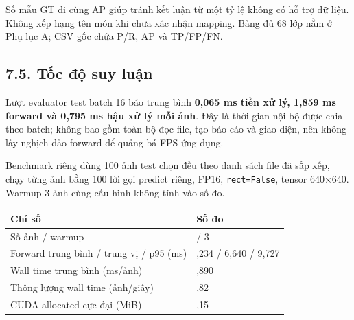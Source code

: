 \documentclass[
  vietnamese,
  12pt,
  a4paper,
]{article}
\newcounter{none} %
\begin{document}
\endgroup

Số mẫu GT đi cùng AP giúp tránh kết luận từ một tỷ lệ không có hỗ trợ dữ
liệu. Không xếp hạng tên món khi chưa xác nhận mapping. Bảng đủ 68 lớp
nằm ở Phụ lục A; CSV gốc chứa P/R, AP và TP/FP/FN.

\subsection{7.5. Tốc độ suy
luận}\label{tux1ed1c-ux111ux1ed9-suy-luux1eadn}

Lượt evaluator test batch 16 báo trung bình \textbf{0,065 ms tiền xử lý,
1,859 ms forward và 0,795 ms hậu xử lý mỗi ảnh}. Đây là thời gian nội bộ
được chia theo batch; không bao gồm toàn bộ đọc file, tạo báo cáo và
giao diện, nên không lấy nghịch đảo forward để quảng bá FPS ứng dụng.

Benchmark riêng dùng 100 ảnh test chọn đều theo danh sách file đã sắp
xếp, chạy từng ảnh bằng 100 lời gọi predict riêng, FP16,
\texttt{r\allowbreak{}e\allowbreak{}c\allowbreak{}t\allowbreak{}=\allowbreak{}F\allowbreak{}a\allowbreak{}l\allowbreak{}s\allowbreak{}e\allowbreak{}},
tensor 640×640. Warmup 3 ảnh cùng cấu hình không tính vào số đo.

\begingroup\small\setlength{\tabcolsep}{4pt}\renewcommand{\arraystretch}{1.12}

{\def\LTcaptype{none} %
\begin{longtable}[]{@{}
  >{\raggedright\arraybackslash}p{}
  >{\raggedright\arraybackslash}p{}@{}}
\toprule\noalign{}
\begin{minipage}[b]{\linewidth}\raggedright
Chỉ số
\end{minipage} & \begin{minipage}[b]{\linewidth}\raggedright
Số đo
\end{minipage} \\
\midrule\noalign{}
\endhead
\bottomrule\noalign{}
\endlastfoot
Số ảnh / warmup & 100 / 3 \\
Forward trung bình / trung vị / p95 (ms) & 7,234 / 6,640 / 9,727 \\
Wall time trung bình (ms/ảnh) & 10,890 \\
Thông lượng wall time (ảnh/giây) & 91,82 \\
CUDA allocated cực đại (MiB) & 80,15 \\
\end{longtable}
}
\end{document}

